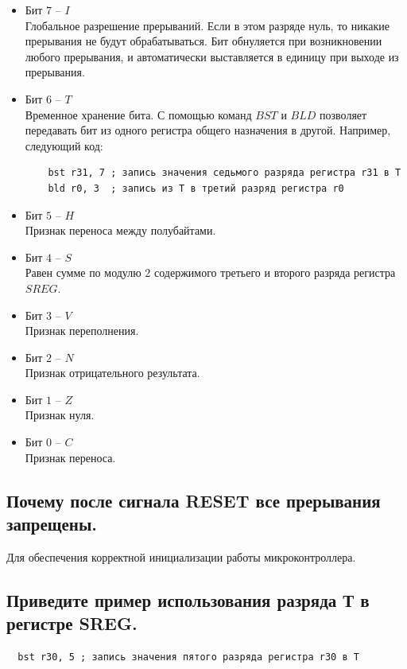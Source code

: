 \begin{itemize}
  \item Бит $7$ -- $I$\\
  Глобальное разрешение прерываний.
  Если в этом разряде нуль, то никакие прерывания не будут обрабатываться.
  Бит обнуляется при возникновении любого прерывания, 
  и автоматически выставляется в единицу при выходе из прерывания.
  \item Бит $6$ -- $T$\\
  Временное хранение бита.
  С помощью команд $BST$ и $BLD$ позволяет передавать
  бит из одного регистра общего назначения в другой. Например,
  следующий код:
  \begin{verbatim}
    bst r31, 7 ; запись значения седьмого разряда регистра r31 в T
    bld r0, 3  ; запись из T в третий разряд регистра r0
  \end{verbatim}
  \item Бит $5$ -- $H$\\
  Признак переноса между полубайтами.
  \item Бит $4$ -- $S$\\
  Равен сумме по модулю $2$ содержимого третьего и второго разряда
  регистра $SREG$.
  \item Бит $3$ -- $V$\\
  Признак переполнения.
  \item Бит $2$ -- $N$\\
  Признак отрицательного результата.
  \item Бит $1$ -- $Z$\\
  Признак нуля.
  \item Бит $0$ -- $C$\\
  Признак переноса.
\end{itemize}

\subsection{Почему после сигнала RESET все прерывания запрещены.}
Для обеспечения корректной инициализации работы
микроконтроллера.

\subsection{Приведите пример использования разряда Т в регистре SREG.}
\begin{verbatim}
  bst r30, 5 ; запись значения пятого разряда регистра r30 в T
\end{verbatim}


